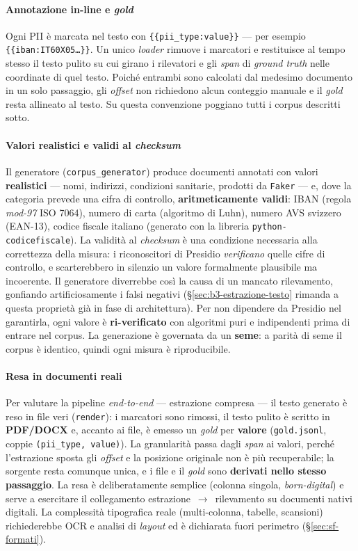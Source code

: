 \paragraph*{Annotazione in-line e \textit{gold}} Ogni PII è marcata nel testo con \texttt{\{\{pii\_type:value\}\}} --- per esempio \texttt{\{\{iban:IT60X05\dots\}\}}. Un unico \textit{loader} rimuove i marcatori e restituisce al tempo stesso il testo pulito su cui girano i rilevatori e gli \textit{span} di \textit{ground truth} nelle coordinate di quel testo. Poiché entrambi sono calcolati dal medesimo documento in un solo passaggio, gli \textit{offset} non richiedono alcun conteggio manuale e il \textit{gold} resta allineato al testo. Su questa convenzione poggiano tutti i corpus descritti sotto.

\paragraph*{Valori realistici e validi al \textit{checksum}} Il generatore (\texttt{corpus\_generator}) produce documenti annotati con valori \textbf{realistici} --- nomi, indirizzi, condizioni sanitarie, prodotti da \texttt{Faker} --- e, dove la categoria prevede una cifra di controllo, \textbf{aritmeticamente validi}: IBAN (regola \textit{mod-97} ISO 7064), numero di carta (algoritmo di Luhn), numero AVS svizzero (EAN-13), codice fiscale italiano (generato con la libreria \texttt{python-codicefiscale}). La validità al \textit{checksum} è una condizione necessaria alla correttezza della misura: i riconoscitori di Presidio \emph{verificano} quelle cifre di controllo, e scarterebbero in silenzio un valore formalmente plausibile ma incoerente. Il generatore diverrebbe così la causa di un mancato rilevamento, gonfiando artificiosamente i falsi negativi (§\ref{sec:b3-estrazione-testo} rimanda a questa proprietà già in fase di architettura). Per non dipendere da Presidio nel garantirla, ogni valore è \textbf{ri-verificato} con algoritmi puri e indipendenti prima di entrare nel corpus. La generazione è governata da un \textbf{seme}: a parità di seme il corpus è identico, quindi ogni misura è riproducibile.

\paragraph*{Resa in documenti reali} Per valutare la pipeline \emph{end-to-end} --- estrazione compresa --- il testo generato è reso in file veri (\texttt{render}): i marcatori sono rimossi, il testo pulito è scritto in \textbf{PDF/DOCX} e, accanto ai file, è emesso un \textit{gold} per \textbf{valore} (\texttt{gold.jsonl}, coppie \texttt{(pii\_type, value)}). La granularità passa dagli \textit{span} ai valori, perché l'estrazione sposta gli \textit{offset} e la posizione originale non è più recuperabile; la sorgente resta comunque unica, e i file e il \textit{gold} sono \textbf{derivati nello stesso passaggio}. La resa è deliberatamente semplice (colonna singola, \emph{born-digital}) e serve a esercitare il collegamento estrazione~$\rightarrow$~rilevamento su documenti nativi digitali. La complessità tipografica reale (multi-colonna, tabelle, scansioni) richiederebbe OCR e analisi di \textit{layout} ed è dichiarata fuori perimetro (§\ref{sec:sf-formati}).

